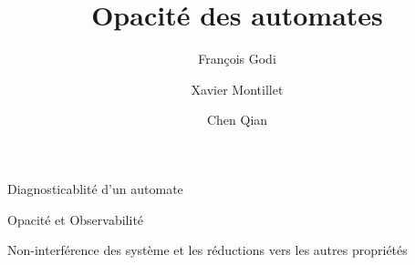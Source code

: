 \documentclass[11pt]{beamer}
\author{François Godi \and Xavier Montillet \and Chen Qian}
\title{Opacit\'e des automates}
\begin{document}
\begin{frame}
\titlepage
\end{frame}

\begin{frame}
\tableofcontents
\end{frame}

\begin{section}{Diagnosticablit\'e d'un automate}

\end{section}

\begin{section}{Opacit\'e et Observabilit\'e}
 
 
\end{section}


\begin{section}{Non-interf\'erence des syst\`eme et les r\'eductions vers les autres propri\'et\'es}
 
 
\end{section}
\end{document}
